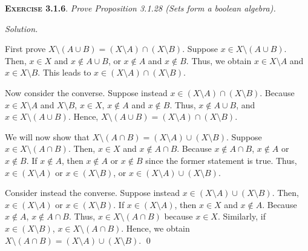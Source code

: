 \documentclass[12pt]{article}
\theoremstyle{remark}
\newenvironment{exer}[2]{
    \noindent \setlength{\parskip}{1em}%
    \textsc{\textbf{Exercise #1}}. \textit{#2} \par
    \noindent \textit{Solution.} %
}{\bigskip}
\begin{document}
\begin{exer}{3.1.6}{
    Prove Proposition 3.1.28 (Sets form a boolean algebra).
}
\begin{enumerate}[topsep=0mm, label=(\alph*)]
            First prove $X \setminus (A \cup B) = (X \setminus A) \cap (X \setminus B)$.
            Suppose $x \in X \setminus (A \cup B)$.
            Then, $x \in X$ and $x \notin A \cup B$, or $x \notin A$ and $x \notin B$.
            Thus, we obtain $x \in X \setminus A$ and $x \in X \setminus B$.
            This leads to $x \in (X \setminus A) \cap (X \setminus B)$.
            
            Now consider the converse.
            Suppose instead $x \in (X \setminus A) \cap (X \setminus B)$.
            Because $x \in X \setminus A$ and $X \setminus B$, $x \in X$, $x \notin A$ and $x \notin B$.
            Thus, $x \notin A \cup B$, and $x \in X \setminus (A \cup B)$.
            Hence, $X \setminus (A \cup B) = (X \setminus A) \cap (X \setminus B)$.

            We will now show that $X \setminus (A \cap B) = (X \setminus A) \cup (X \setminus B)$.
            Suppose $x \in X \setminus (A \cap B)$.
            Then, $x \in X$ and $x \notin A \cap B$.
            Because $x \notin A \cap B$, $x \notin A$ or $x \notin B$.
            If $x \notin A$, then $x \notin A$ or $x \notin B$ since the former statement is true.
            Thus, $x \in (X \setminus A)$ or $x \in (X \setminus B)$, or $x \in (X \setminus A) \cup (X \setminus B)$.

            Consider instead the converse.
            Suppose instead $x \in (X \setminus A) \cup (X \setminus B)$.
            Then, $x \in (X \setminus A)$ or $x \in (X \setminus B)$.
            If $x \in (X \setminus A)$, then $x \in X$ and $x \notin A$.
            Because $x \notin A$, $x \notin A \cap B$.
            Thus, $x \in X \setminus (A \cap B)$ because $x \in X$.
            Similarly, if $x \in (X \setminus B)$, $x \in X \setminus (A \cap B)$.
            Hence, we obtain $X \setminus (A \cap B) = (X \setminus A) \cup (X \setminus B)$. \qed

    \end{enumerate}
\end{exer}
\end{document}
